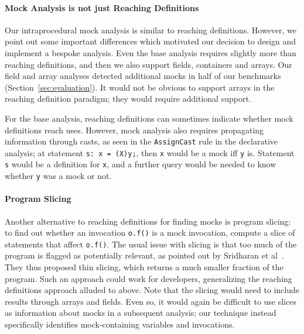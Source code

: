 \paragraph{Mock Analysis is not just Reaching Definitions}
Our intraprocedural mock analysis is similar to reaching definitions. However, we point out some important differences which motivated our decision to design and implement a bespoke analysis. Even the base analysis requires slightly more than reaching definitions, and then we also support fields, containers and arrays. Our field and array analyses detected additional mocks in half of our benchmarks (Section~\ref{sec:evaluation}). It would not be obvious to support arrays in the reaching definition paradigm; they would require additional support.

For the base analysis, reaching definitions can sometimes indicate whether mock definitions reach uses. However, mock analysis also requires propagating information through casts, as seen in the \texttt{AssignCast} rule in the declarative analysis; at statement {\tt s: x = (X)y;}, then {\tt x} would be a mock iff {\tt y} is. Statement {\tt s} would be a definition for {\tt x}, and a further query would be needed to know whether {\tt y} was a mock or not.

\paragraph{Program Slicing}
Another alternative to reaching definitions for finding mocks is program slicing: to find out whether an invocation {\tt o.f()} is a mock invocation, compute a slice of statements that affect {\tt o.f()}. The usual issue with slicing is that too much of the program is flagged as potentially relevant, as pointed out by Sridharan et al~\cite{sridharan07:_thin_slicin}. They thus proposed thin slicing, which returns a much smaller fraction of the program. Such an approach could work for developers, generalizing the reaching definitions approach alluded to above. Note that the slicing would need to include results through arrays and fields. Even so, it would again be difficult to use slices as information about mocks in a subsequent analysis; our technique instead specifically identifies mock-containing variables and invocations.

